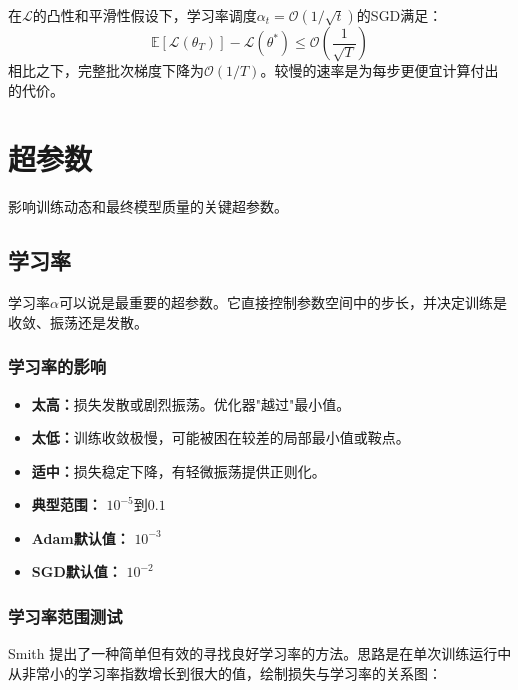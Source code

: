 \begin{theorem}[SGD在递减学习率下的收敛性]
在$\mathcal{L}$的凸性和平滑性假设下，学习率调度$\alpha_t = \mathcal{O}(1/\sqrt{t})$的SGD满足：
\begin{equation}
\mathbb{E}[\mathcal{L}(\theta_T)] - \mathcal{L}(\theta^*) \leq \mathcal{O}\!\left(\frac{1}{\sqrt{T}}\right)
\end{equation}
相比之下，完整批次梯度下降为$\mathcal{O}(1/T)$。较慢的速率是为每步更便宜计算付出的代价。
\end{theorem}

\section{超参数}

影响训练动态和最终模型质量的关键超参数。

\subsection{学习率}

学习率$\alpha$可以说是最重要的超参数。它直接控制参数空间中的步长，并决定训练是收敛、振荡还是发散。

\subsubsection{学习率的影响}

\begin{itemize}
    \item \textbf{太高：}损失发散或剧烈振荡。优化器"越过"最小值。
    \item \textbf{太低：}训练收敛极慢，可能被困在较差的局部最小值或鞍点。
    \item \textbf{适中：}损失稳定下降，有轻微振荡提供正则化。
    \item \textbf{典型范围：} $10^{-5}$到$0.1$
    \item \textbf{Adam默认值：} $10^{-3}$
    \item \textbf{SGD默认值：} $10^{-2}$
\end{itemize}

\subsubsection{学习率范围测试}

Smith \cite{smith2017cyclical}提出了一种简单但有效的寻找良好学习率的方法。思路是在单次训练运行中从非常小的学习率指数增长到很大的值，绘制损失与学习率的关系图：

